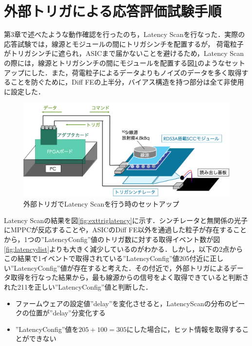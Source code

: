 
\section{外部トリガによる応答評価試験手順}
\label{sec:exthow}
第3章で述べたような動作確認を行ったのち，Latency Scanを行なった．実際の応答試験では，線源とモジュールの間にトリガシンチを配置するが， 荷電粒子がトリガシンチに遮られ，ASICまで届かないことを避けるため，Latency Scanの際には，線源とトリガシンチの間にモジュールを配置する図\ref{fig:extlatencysetup}のようなセットアップにした．また，荷電粒子によるデータよりもノイズのデータを多く取得することを防ぐために，Diff FEの上半分，バイアス構造を持つ部分は全て非使用に設定した．

\begin{figure}[h]
  \centering
  \includegraphics[width=12cm]{./figure/extlatencysetup.png}
  \caption{外部トリガでLatency Scanを行う時のセットアップ}
  \label{fig:extlatencysetup}
\end{figure}

Latency Scanの結果を図\ref{fig:exttriglatency}に示す．シンチレータと無関係の光子にMPPCが反応することや，ASICのDiff FE以外を通過した粒子が存在することから，1つの''LatencyConfig''値のトリガ数に対する取得イベント数が図\ref{fig:latencydist}よりも大きく減少しているのがわかる．しかし，以下の2点からこの結果で1イベントで取得されている''LatencyConfig''値205付近に正しい''LatencyConfig''値が存在すると考えた．その付近で，外部トリガによるデータ取得を行なった結果から，最も線源からの信号をよく取得できていると判断された211を正しい''LatencyConfig''値と判断した．
\begin{itemize}
\item ファームウェアの設定値''delay''を変化させると，LatencyScanの分布のピークの位置が''delay''分変化する
\item ''LatencyConfig''値を$205 + 100 = 305$にした場合に，ヒット情報を取得することができない
\end{itemize}

